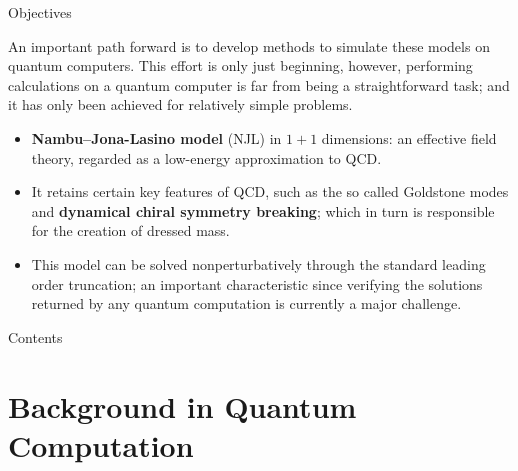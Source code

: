 \documentclass[9pt, handout, aspectratio=169]{beamer}	%
\begin{document}
\begin{frame}{Objectives}

	An important path forward is to develop methods to simulate these models on quantum computers. This effort is only just beginning, however, performing calculations on a quantum computer is far from being a straightforward task; and it has only been achieved for relatively simple problems.

	\medskip

	\begin{itemize}
		\item<2-> \textbf{Nambu--Jona-Lasino model} (NJL) in $1+1$ dimensions: an effective field theory, regarded as a low-energy approximation to QCD.
		\item<3-> It retains certain key features of QCD, such as the so called Goldstone modes and \textbf{dynamical chiral symmetry breaking}; which in turn is responsible for the creation of dressed mass.
		\item<4-> This model can be solved nonperturbatively through the standard leading order truncation; an important characteristic since verifying the solutions returned by any quantum computation is currently a major challenge.
	\end{itemize}

\end{frame}


\begin{frame}[c]{Contents}
	\tableofcontents
\end{frame}


\section{Background in Quantum Computation}
\end{document}
